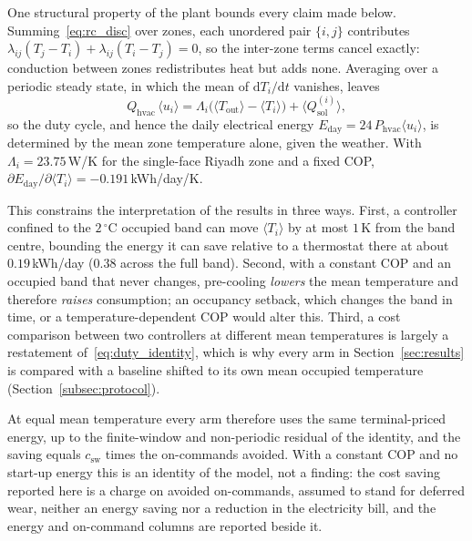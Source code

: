 \documentclass[3p,twocolumn,number]{elsarticle}
\newcommand{\Tout}{T_{\mathrm{out}}}
\newcommand{\lij}{\lambda_{ij}}
\newcommand{\Qhvac}{Q_{\mathrm{hvac}}}
\newcommand{\csw}{c_{\mathrm{sw}}}
\newcommand{\Phvac}{P_{\mathrm{hvac}}}
\begin{document}
\begin{remark}
\label{rem:energy_identity}
One structural property of the plant bounds every claim made below. Summing~\eqref{eq:rc_disc} over zones, each unordered pair $\{i,j\}$ contributes $\lij(T_j-T_i)+\lij(T_i-T_j)=0$, so the inter-zone terms cancel exactly: conduction between zones redistributes heat but adds none. Averaging over a periodic steady state, in which the mean of $\mathrm{d}T_i/\mathrm{d}t$ vanishes, leaves
\begin{equation}
  \Qhvac\,\langle u_i\rangle=\Lambda_i\bigl(\langle\Tout\rangle-\langle T_i\rangle\bigr)+\langle Q_{\mathrm{sol}}^{(i)}\rangle,
  \label{eq:duty_identity}
\end{equation}
so the duty cycle, and hence the daily electrical energy $E_{\mathrm{day}}=24\,\Phvac\langle u_i\rangle$, is determined by the mean zone temperature alone, given the weather. With $\Lambda_i=23.75\,$W/K for the single-face Riyadh zone and a fixed COP, $\partial E_{\mathrm{day}}/\partial\langle T_i\rangle=-0.191\,$kWh/day/K.

This constrains the interpretation of the results in three ways. First, a controller confined to the $2\,^\circ$C occupied band can move $\langle T_i\rangle$ by at most $1\,$K from the band centre, bounding the energy it can save relative to a thermostat there at about $0.19\,$kWh/day ($0.38$ across the full band). Second, with a constant COP and an occupied band that never changes, pre-cooling \emph{lowers} the mean temperature and therefore \emph{raises} consumption; an occupancy setback, which changes the band in time, or a temperature-dependent COP would alter this. Third, a cost comparison between two controllers at different mean temperatures is largely a restatement of~\eqref{eq:duty_identity}, which is why every arm in Section~\ref{sec:results} is compared with a baseline shifted to its own mean occupied temperature (Section~\ref{subsec:protocol}).

At equal mean temperature every arm therefore uses the same terminal-priced energy, up to the finite-window and non-periodic residual of the identity, and the saving equals $\csw$ times the on-commands avoided. With a constant COP and no start-up energy this is an identity of the model, not a finding: the cost saving reported here is a charge on avoided on-commands, assumed to stand for deferred wear, neither an energy saving nor a reduction in the electricity bill, and the energy and on-command columns are reported beside it.
\end{remark}
\end{document}
